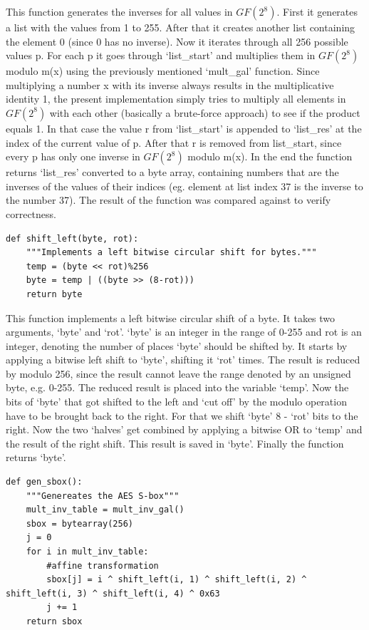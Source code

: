 This function generates the inverses for all values in $GF(2^{8})$. First it
generates a list with the values from 1 to 255. After that it creates
another list containing the element 0 (since 0 has no inverse). Now it
iterates through all 256 possible values p. For each p it goes through
`list\_start' and multiplies them in $GF(2^{8})$ modulo m(x) using the
previously mentioned `mult\_gal' function. Since multiplying a number x
with its inverse always results in the multiplicative identity 1, the
present implementation simply tries to multiply all elements in $GF(2^{8})$
with each other (basically a brute-force approach) to see if the product
equals 1. In that case the value r from `list\_start' is appended to
`list\_res' at the index of the current value of p. After that r is
removed from list\_start, since every p has only one inverse in $GF(2^{8})$
modulo m(x). In the
end the function returns `list\_res' converted to a byte array,
containing numbers that are the inverses of the values of their indices
(eg. element at list index 37 is the inverse to the number 37).
The result of the function was compared against \cite[Table A.5.]{rijndael} to verify
correctness.

\begin{lstlisting}
def shift_left(byte, rot):
    """Implements a left bitwise circular shift for bytes."""
    temp = (byte << rot)%256
    byte = temp | ((byte >> (8-rot)))
    return byte
\end{lstlisting}

This function implements a left bitwise circular shift of a byte. It
takes two arguments, `byte' and `rot'. `byte' is an integer in the range
of 0-255 and rot is an integer, denoting the number of places `byte'
should be shifted by. It starts by applying a bitwise left shift to
`byte', shifting it `rot' times. The result is reduced by modulo 256,
since the result cannot leave the range denoted by an unsigned byte,
e.g. 0-255. The reduced result is placed into the variable `temp'. Now
the bits of `byte' that got shifted to the left and `cut off' by the
modulo operation have to be brought back to the right. For that we shift
`byte' 8 - `rot' bits to the right. Now the two `halves' get combined by
applying a bitwise OR to `temp' and the result of the right shift. This
result is saved in `byte'. Finally the function returns `byte'.

\begin{lstlisting}
def gen_sbox():
    """Genereates the AES S-box"""
    mult_inv_table = mult_inv_gal()
    sbox = bytearray(256)
    j = 0
    for i in mult_inv_table:
        #affine transformation
        sbox[j] = i ^ shift_left(i, 1) ^ shift_left(i, 2) ^ shift_left(i, 3) ^ shift_left(i, 4) ^ 0x63
        j += 1
    return sbox
\end{lstlisting}

